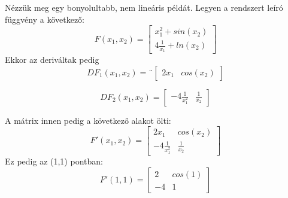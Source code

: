 \documentclass{article}
\theoremstyle{definition}
\theoremstyle{theorem}
\begin{document}

Nézzük meg egy bonyolultabb, nem lineáris példát. Legyen a rendszert leíró függvény a következő:
\begin{equation*}
    F(x_1,x_2) =
    \begin{bmatrix}
        x_1 ^ 2 + sin(x_2) \\
        4 \frac{1}{x_1} + ln(x_2)
    \end{bmatrix}
\end{equation*}
Ekkor az deriváltak pedig
\begin{equation*}
    D F_1 (x_1, x_2) = ¨\begin{bmatrix}
        2 x_1 & cos(x_2)
    \end{bmatrix}
\end{equation*}

\begin{equation*}
    D F_2 (x_1,x_2) = \begin{bmatrix}
        - 4 \frac{1}{x_1 ^ 2} & \frac{1}{x_2}
    \end{bmatrix}
\end{equation*}

A mátrix innen pedig a következő alakot ölti:
\begin{equation*}
    F'(x_1,x_2) =
    \begin{bmatrix}
        2 x_1 & cos(x_2) \\
        - 4 \frac{1}{x_1 ^ 2} & \frac{1}{x_2}
    \end{bmatrix}
\end{equation*}
Ez pedig az (1,1) pontban:
\begin{equation*}
    F'(1,1) = \begin{bmatrix}
        2 & cos(1) \\
        -4 & 1
    \end{bmatrix}
\end{equation*}
\end{document}
